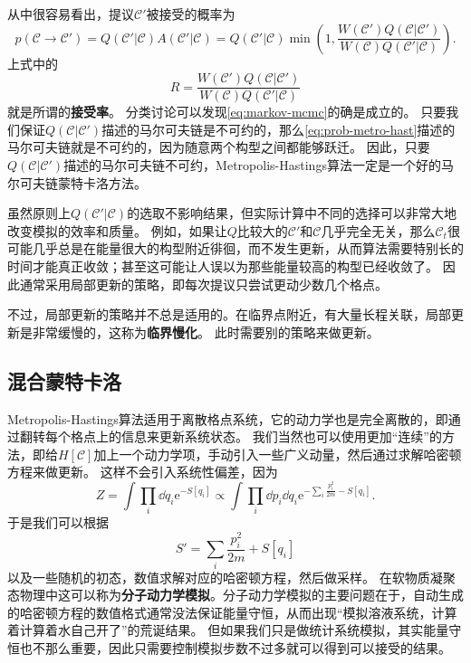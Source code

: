 \documentclass[hyperref, UTF8, a4paper]{ctexart}
\newcommand*{\ee}{\mathrm{e}}
\renewcommand{\autoref}{\prettyref}
\newcommand*{\concept}[1]{{\textbf{#1}}}
\begin{document}
从\autoref{alg:metro-hast}中很容易看出，提议$\mathcal{C}'$被接受的概率为
\begin{equation}
    p(\mathcal{C} \to \mathcal{C}') = Q(\mathcal{C}' | \mathcal{C}) A(\mathcal{C}' | \mathcal{C}) = Q(\mathcal{C}' | \mathcal{C}) \min \left(1, \frac{W(\mathcal{C}') Q(\mathcal{C} | \mathcal{C}')}{W(\mathcal{C}) Q(\mathcal{C}' | \mathcal{C})} \right).
    \label{eq:prob-metro-hast}
\end{equation}
上式中的
\begin{equation}
    R = \frac{W(\mathcal{C}') Q(\mathcal{C} | \mathcal{C}')}{W(\mathcal{C}) Q(\mathcal{C}' | \mathcal{C})}
\end{equation}
就是所谓的\concept{接受率}。
分类讨论可以发现\eqref{eq:markov-mcmc}的确是成立的。
只要我们保证$Q(\mathcal{C} | \mathcal{C}')$描述的马尔可夫链是不可约的，那么\eqref{eq:prob-metro-hast}描述的马尔可夫链就是不可约的，因为随意两个构型之间都能够跃迁。
因此，只要$Q(\mathcal{C} | \mathcal{C}')$描述的马尔可夫链不可约，Metropolis-Hastings算法一定是一个好的马尔可夫链蒙特卡洛方法。

虽然原则上$Q(\mathcal{C}' | \mathcal{C})$的选取不影响结果，但实际计算中不同的选择可以非常大地改变模拟的效率和质量。
例如，如果让$Q$比较大的$\mathcal{C}'$和$\mathcal{C}$几乎完全无关，那么$\mathcal{C}_t$很可能几乎总是在能量很大的构型附近徘徊，而不发生更新，从而算法需要特别长的时间才能真正收敛；甚至这可能让人误以为那些能量较高的构型已经收敛了。
因此通常采用局部更新的策略，即每次提议只尝试更动少数几个格点。

不过，局部更新的策略并不总是适用的。在临界点附近，有大量长程关联，局部更新是非常缓慢的，这称为\concept{临界慢化}。
此时需要别的策略来做更新。

\subsection{混合蒙特卡洛}

Metropolis-Hastings算法适用于离散格点系统，它的动力学也是完全离散的，即通过翻转每个格点上的信息来更新系统状态。
我们当然也可以使用更加“连续”的方法，即给$H[\mathcal{C}]$加上一个动力学项，手动引入一些广义动量，然后通过求解哈密顿方程来做更新。
这样不会引入系统性偏差，因为
\begin{equation}
    Z = \int \prod_i \dd{q_i} \ee^{- S[q_i]} \propto \int \prod_i \dd{p}_i \dd{q}_i \ee^{-\sum_i \frac{p_i^2}{2m} - S[q_i]}.
    \label{eq:molecular-dynamics}
\end{equation}
于是我们可以根据
\[
    S' = \sum_i \frac{p_i^2}{2m} + S[q_i]
\]
以及一些随机的初态，数值求解对应的哈密顿方程，然后做采样。
在软物质凝聚态物理中这可以称为\concept{分子动力学模拟}。分子动力学模拟的主要问题在于，自动生成的哈密顿方程的数值格式通常没法保证能量守恒，从而出现“模拟溶液系统，计算着计算着水自己开了”的荒诞结果。
但如果我们只是做统计系统模拟，其实能量守恒也不那么重要，因此只需要控制模拟步数不过多就可以得到可以接受的结果。
\end{document}
